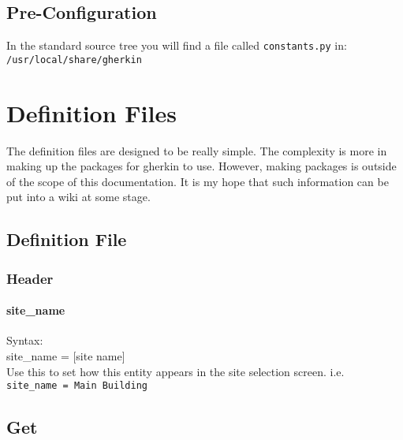 \documentclass{article}
\begin{document}
\subsection{Pre-Configuration}
In the standard source tree you will find a file called \texttt{constants.py} in:\\
\texttt{/usr/local/share/gherkin}
\section{Definition Files}
The definition files are designed to be really simple. The complexity is
more in making up the packages for gherkin to use. However, making packages
is outside of the scope of this documentation. It is my hope that such
information can be put into a wiki at some stage.
\subsection{Definition File}
\subsubsection{Header}
\paragraph{site\_name}
Syntax:\\
site\_name = [site name]\\
Use this to set how this entity appears in the site selection screen. i.e.\\
\texttt{site\_name = Main Building}
\subsection{Get}
\subsubsection{}
\end{document}
